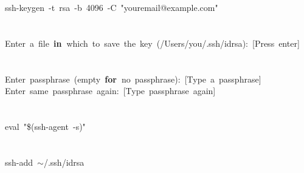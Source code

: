 \documentclass{beamer}\usepackage[]{graphicx}\usepackage[]{color}
\makeatletter
\newcommand{\hlnum}[1]{\textcolor[rgb]{0.686,0.059,0.569}{#1}}%
\newcommand{\hlstr}[1]{\textcolor[rgb]{0.192,0.494,0.8}{#1}}%
\newcommand{\hlopt}[1]{\textcolor[rgb]{0,0,0}{#1}}%
\newcommand{\hlstd}[1]{\textcolor[rgb]{0.345,0.345,0.345}{#1}}%
\newcommand{\hlkwa}[1]{\textcolor[rgb]{0.161,0.373,0.58}{\textbf{#1}}}%
\newcommand{\hlkwb}[1]{\textcolor[rgb]{0.69,0.353,0.396}{#1}}%
\newcommand{\hlkwc}[1]{\textcolor[rgb]{0.333,0.667,0.333}{#1}}%
\newenvironment{kframe}{%
 \def\at@end@of@kframe{}%
 \ifinner\ifhmode%
  \def\at@end@of@kframe{\end{minipage}}%
  \begin{minipage}{\columnwidth}%
 \fi\fi%
 \def\FrameCommand##1{\hskip\@totalleftmargin \hskip-\fboxsep
 \colorbox{shadecolor}{##1}\hskip-\fboxsep
     \hskip-\linewidth \hskip-\@totalleftmargin \hskip\columnwidth}%
 \MakeFramed {\advance\hsize-\width
   \@totalleftmargin\z@ \linewidth\hsize
   \@setminipage}}%
 {\par\unskip\endMakeFramed%
 \at@end@of@kframe}
\newenvironment{knitrout}{}{} %
\makeatother
\begin{document}
\begin{frame}[fragile]
\begin{knitrout}\footnotesize
{}\color{fgcolor}\begin{kframe}
\noindent
\ttfamily
\hlstd{ssh{-}keygen\ }\hlopt{{-}}\hlstd{t\ rsa\ }\hlopt{{-}}\hlstd{b\ }\hlnum{4096\ }\hlstd{}\hlopt{{-}}\hlstd{C\ }\hlstr{"your\textunderscore email@example.com"}\hlstd{\ }\hspace*{\fill}\\
\hlstd{}\hspace*{\fill}\\
\hspace*{\fill}\\
\hlstd{Enter\ a\ }\hlkwc{file\ }\hlstd{}\hlkwa{in\ }\hlstd{}\hlkwc{which\ }\hlstd{to\ save\ the\ key\ }\hlopt{(/}\hlstd{Users}\hlopt{/}\hlstd{you}\hlopt{/}\hlstd{.}\hlkwc{ssh}\hlstd{}\hlopt{/}\hlstd{id\textunderscore rsa}\hlopt{):\ {[}}\hlstd{Press\ enter}\hlopt{{]}}\hspace*{\fill}\\
\hlstd{}\hspace*{\fill}\\
\hspace*{\fill}\\
\hlstd{Enter\ passphrase\ }\hlopt{(}\hlstd{empty\ }\hlkwa{for\ }\hlstd{no\ passphrase}\hlopt{):\ {[}}\hlstd{Type\ a\ passphrase}\hlopt{{]}}\hspace*{\fill}\\
\hlstd{Enter\ same\ passphrase\ again}\hlopt{:\ {[}}\hlstd{Type\ passphrase\ again}\hlopt{{]}}\hspace*{\fill}\\
\hlstd{}\hspace*{\fill}\\
\hspace*{\fill}\\
\hlstd{}\hlkwb{eval\ }\hlstd{}\hlstr{"\$(ssh{-}agent\ {-}s)"}\hlstd{}\hspace*{\fill}\\
\hspace*{\fill}\\
\hspace*{\fill}\\
\hlstd{ssh{-}add\ $\sim$}\hlopt{/}\hlstd{.}\hlkwc{ssh}\hlstd{}\hlopt{/}\hlstd{id\textunderscore rsa}\hspace*{\fill}
\mbox{}
\normalfont
\end{kframe}
\end{knitrout}

\end{frame}
\end{document}
